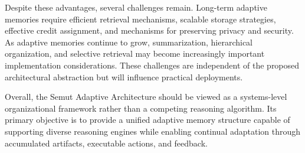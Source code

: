 Despite these advantages, several challenges remain. Long-term adaptive memories require efficient retrieval mechanisms, scalable storage strategies, effective credit assignment, and mechanisms for preserving privacy and security. As adaptive memories continue to grow, summarization, hierarchical organization, and selective retrieval may become increasingly important implementation considerations. These challenges are independent of the proposed architectural abstraction but will influence practical deployments.

Overall, the Semut Adaptive Architecture should be viewed as a systems-level organizational framework rather than a competing reasoning algorithm. Its primary objective is to provide a unified adaptive memory structure capable of supporting diverse reasoning engines while enabling continual adaptation through accumulated artifacts, executable actions, and feedback.
